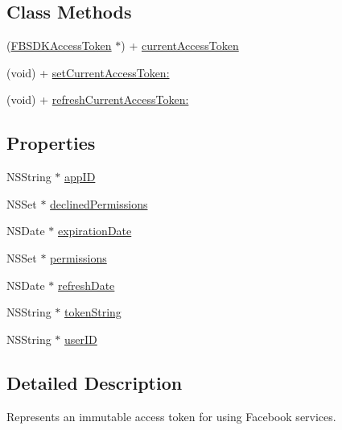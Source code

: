 \subsection*{Class Methods}
\begin{DoxyCompactItemize}
\item 
(\hyperlink{interface_f_b_s_d_k_access_token}{F\-B\-S\-D\-K\-Access\-Token} $\ast$) + \hyperlink{interface_f_b_s_d_k_access_token_a245bde98fb3133bce397d2934b420da8}{current\-Access\-Token}
\item 
(void) + \hyperlink{interface_f_b_s_d_k_access_token_a001ba021b6297da1a52c1c0e0b089ef2}{set\-Current\-Access\-Token\-:}
\item 
(void) + \hyperlink{interface_f_b_s_d_k_access_token_aec2f48a718581096649c2ca88d16f1ac}{refresh\-Current\-Access\-Token\-:}
\end{DoxyCompactItemize}
\subsection*{Properties}
\begin{DoxyCompactItemize}
\item 
N\-S\-String $\ast$ \hyperlink{interface_f_b_s_d_k_access_token_a421ecb43a439e88824ec8053b39d34c6}{app\-I\-D}
\item 
N\-S\-Set $\ast$ \hyperlink{interface_f_b_s_d_k_access_token_ab4956044ecf71be910f37f3309431d9d}{declined\-Permissions}
\item 
N\-S\-Date $\ast$ \hyperlink{interface_f_b_s_d_k_access_token_aea6bd2db9834ca1610f2ed47a3e28c2f}{expiration\-Date}
\item 
N\-S\-Set $\ast$ \hyperlink{interface_f_b_s_d_k_access_token_a2149ed50b338301f93c4ff43915076d3}{permissions}
\item 
N\-S\-Date $\ast$ \hyperlink{interface_f_b_s_d_k_access_token_a97b06b3694130f8d29761fe98e19e94f}{refresh\-Date}
\item 
N\-S\-String $\ast$ \hyperlink{interface_f_b_s_d_k_access_token_a03b123d10be809c697973673cd805b22}{token\-String}
\item 
N\-S\-String $\ast$ \hyperlink{interface_f_b_s_d_k_access_token_ab8217b11468a826310a27ffe1e79ac7e}{user\-I\-D}
\end{DoxyCompactItemize}


\subsection{Detailed Description}
Represents an immutable access token for using Facebook services. 

